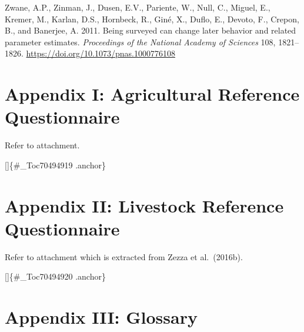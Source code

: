 \documentclass[
]{book}
\begin{document}
Zwane, A.P., Zinman, J., Dusen, E.V., Pariente, W., Null, C., Miguel, E., Kremer, M., Karlan, D.S., Hornbeck, R., Giné, X., Duflo, E., Devoto, F., Crepon, B., and Banerjee, A. 2011. Being surveyed can change later behavior and related parameter estimates. \emph{Proceedings of the National Academy of Sciences} 108, 1821--1826. \url{https://doi.org/10.1073/pnas.1000776108}

\hypertarget{appendix-appendix}{%
\appendix}


\hypertarget{appendix-i-agricultural-reference-questionnaire}{%
\chapter*{Appendix I: Agricultural Reference Questionnaire}\label{appendix-i-agricultural-reference-questionnaire}}

Refer to attachment.

{[}{]}\{\#\_Toc70494919 .anchor\}

\hypertarget{appendix-ii-livestock-reference-questionnaire}{%
\chapter*{Appendix II: Livestock Reference Questionnaire}\label{appendix-ii-livestock-reference-questionnaire}}

Refer to attachment which is extracted from Zezza et al.~(2016b).

{[}{]}\{\#\_Toc70494920 .anchor\}

\hypertarget{appendix-iii-glossary}{%
\chapter*{Appendix III: Glossary}\label{appendix-iii-glossary}}
\end{document}
